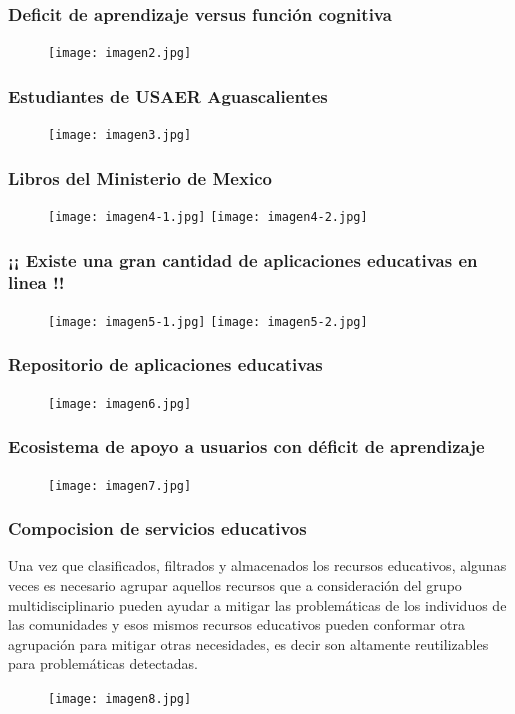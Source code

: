 \documentclass[11pt]{beamer}
\begin{document}
\begin{frame}
\frametitle{Deficit de aprendizaje versus función cognitiva}
    \begin{figure}
    \centering
     \texttt{[image: imagen2.jpg]} 
    \end{figure}
\end{frame}

\begin{frame}
\frametitle{Estudiantes de USAER Aguascalientes}
    \begin{figure}
    \centering
     \texttt{[image: imagen3.jpg]} 
    \end{figure}
\end{frame}

\begin{frame}
\frametitle{Libros del Ministerio de Mexico}
    \begin{figure}
    \centering
     \texttt{[image: imagen4-1.jpg]}
     \texttt{[image: imagen4-2.jpg]}
    \end{figure}
\end{frame}

\begin{frame}
\frametitle{¡¡ Existe una gran cantidad de aplicaciones educativas en linea !!}
    \begin{figure}
    \centering
     \texttt{[image: imagen5-1.jpg]}
     \texttt{[image: imagen5-2.jpg]}
    \end{figure}
\end{frame}

\begin{frame}
\frametitle{Repositorio de aplicaciones educativas}
    \begin{figure}
    \centering
     \texttt{[image: imagen6.jpg]}
    \end{figure}
\end{frame}

\begin{frame}
\frametitle{Ecosistema de apoyo a usuarios con déficit de aprendizaje}
    \begin{figure}
    \centering
     \texttt{[image: imagen7.jpg]}
    \end{figure}
\end{frame}

\begin{frame}
\frametitle{Compocision de servicios educativos}
    \justify
    Una vez que clasificados, filtrados y almacenados los recursos educativos, algunas veces es necesario agrupar aquellos recursos que a consideración del grupo multidisciplinario pueden ayudar a mitigar las problemáticas de los individuos de las comunidades y esos mismos recursos educativos pueden conformar otra agrupación para mitigar otras necesidades, es decir son altamente reutilizables para problemáticas detectadas.
    \par
    \begin{figure}
    \centering
     \texttt{[image: imagen8.jpg]}
    \end{figure}
\end{frame}
\end{document}

